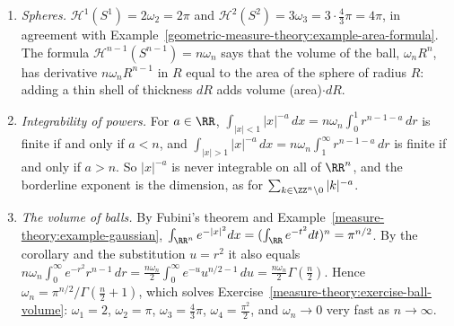 \begin{example}\label{geometric-measure-theory:example-polar}
\begin{enumerate}
\item \emph{Spheres.} $\mathcal{H}^1(S^1) = 2\omega_2 = 2\pi$ and $\mathcal{H}^2(S^2) = 3\omega_3 = 3 \cdot \frac43\pi = 4\pi$, in agreement with Example~\ref{geometric-measure-theory:example-area-formula}. The
formula $\mathcal{H}^{n-1}(S^{n-1}) = n\omega_n$ says that the volume of the ball, $\omega_nR^n$, has derivative $n\omega_nR^{n-1}$ in $R$ equal to the area of the sphere of radius $R$: adding a thin shell of
thickness $dR$ adds volume (area)$\cdot dR$.
\item \emph{Integrability of powers.} For $a \in \RR$, $\int_{|x| < 1}|x|^{-a}\,dx = n\omega_n\int_0^1r^{n-1-a}\,dr$ is finite if and only if $a < n$, and $\int_{|x| > 1}|x|^{-a}\,dx = n\omega_n\int_1^\infty r^{n-1-a}\,dr$
is finite if and only if $a > n$. So $|x|^{-a}$ is never integrable on all of $\RR^n$, and the borderline exponent is the dimension, as for $\sum_{k \in \ZZ^n \setminus 0}|k|^{-a}$.
\item \emph{The volume of balls.} By Fubini's theorem and Example~\ref{measure-theory:example-gaussian}, $\int_{\RR^n}e^{-|x|^2}dx = (\int_\RR e^{-t^2}dt)^n = \pi^{n/2}$. By the corollary and the
substitution $u = r^2$ it also equals $n\omega_n\int_0^\infty e^{-r^2}r^{n-1}\,dr = \frac{n\omega_n}2\int_0^\infty e^{-u}u^{n/2 - 1}\,du = \frac{n\omega_n}2\Gamma(\frac n2)$. Hence
$\omega_n = \pi^{n/2}/\Gamma(\frac n2 + 1)$, which solves Exercise~\ref{measure-theory:exercise-ball-volume}: $\omega_1 = 2$, $\omega_2 = \pi$, $\omega_3 = \frac43\pi$, $\omega_4 = \frac{\pi^2}{2}$, and
$\omega_n \to 0$ very fast as $n \to \infty$.
\end{enumerate}
\end{example}

